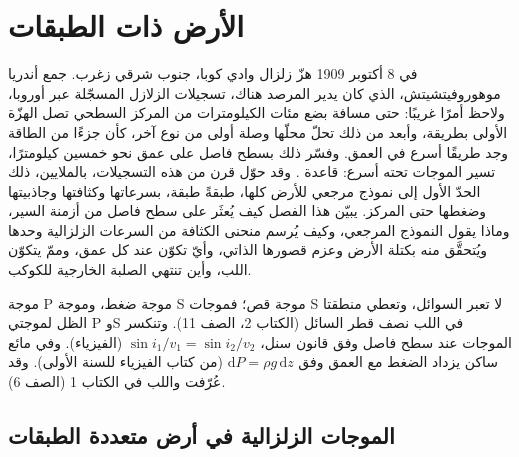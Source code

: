 \chapter{الأرض ذات الطبقات}\label{ch:b1:layered-earth}

في 8 أكتوبر 1909 هزّ زلزال وادي كوبا، جنوب شرقي زغرب.
جمع أندريا موهوروفيتشيتش، الذي كان يدير المرصد هناك، تسجيلات الزلازل المسجّلة عبر أوروبا، ولاحظ أمرًا غريبًا: حتى مسافة بضع مئات الكيلومترات من المركز السطحي تصل الهزّة الأولى بطريقة، وأبعد من ذلك تحلّ محلّها وصلة أولى من نوع آخر، كأن جزءًا من الطاقة وجد طريقًا أسرع في العمق. وفسّر ذلك بسطح فاصل على عمق نحو خمسين كيلومترًا، تسير الموجات تحته أسرع: قاعدة . وقد حوّل قرن من هذه التسجيلات، بالملايين، ذلك الحدّ الأول إلى نموذج مرجعي للأرض كلها، طبقةً طبقة، بسرعاتها وكثافتها وجاذبيتها وضغطها حتى المركز. يبيّن هذا الفصل كيف يُعثَر على سطح فاصل من أزمنة السير، وماذا يقول النموذج المرجعي، وكيف يُرسم منحنى الكثافة من السرعات الزلزالية وحدها ويُتحقَّق منه بكتلة الأرض وعزم قصورها الذاتي، وأيّ  تكوّن  عند كل عمق، وممّ يتكوّن اللب، وأين تنتهي  الصلبة الخارجية للكوكب.

\begin{recall}
موجة P موجة ضغط، وموجة S موجة قص؛ فموجات S لا تعبر السوائل، وتعطي منطقتا الظل لموجتي P وS في اللب نصف قطر  السائل (الكتاب 2، الصف 11). وتنكسر الموجات عند سطح فاصل وفق قانون سنل، $\sin i_1/v_1 = \sin i_2/v_2$ (الفيزياء). وفي مائع ساكن يزداد الضغط مع العمق وفق $\mathrm dP = \rho g\,\mathrm dz$ (من كتاب الفيزياء للسنة الأولى). وقد عُرّفت   واللب في الكتاب 1 (الصف 6).
\end{recall}

\section{الموجات الزلزالية في أرض متعددة الطبقات}

